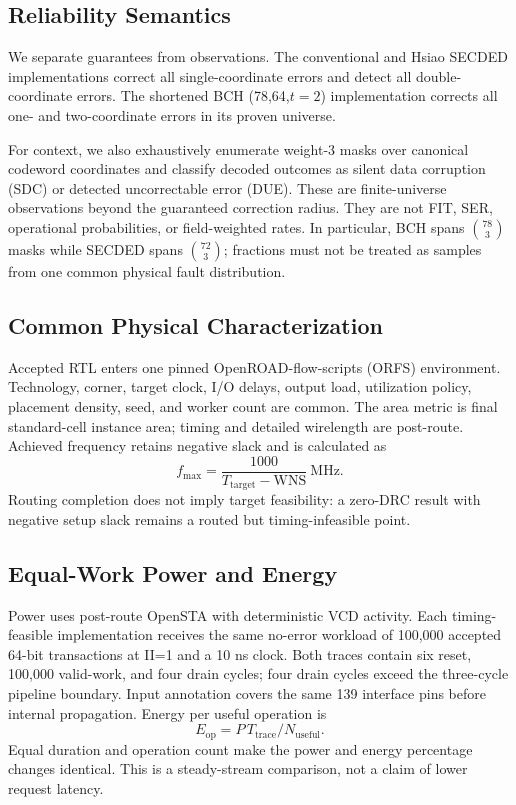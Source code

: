 \subsection{Reliability Semantics}

We separate guarantees from observations. The conventional and Hsiao SECDED implementations correct all single-coordinate errors and detect all double-coordinate errors. The shortened BCH (78,64,$t=2$) implementation corrects all one- and two-coordinate errors in its proven universe.

For context, we also exhaustively enumerate weight-3 masks over canonical codeword coordinates and classify decoded outcomes as silent data corruption (SDC) or detected uncorrectable error (DUE). These are finite-universe observations beyond the guaranteed correction radius. They are not FIT, SER, operational probabilities, or field-weighted rates. In particular, BCH spans $\binom{78}{3}$ masks while SECDED spans $\binom{72}{3}$; fractions must not be treated as samples from one common physical fault distribution.

\subsection{Common Physical Characterization}

Accepted RTL enters one pinned OpenROAD-flow-scripts (ORFS) environment. Technology, corner, target clock, I/O delays, output load, utilization policy, placement density, seed, and worker count are common. The area metric is final standard-cell instance area; timing and detailed wirelength are post-route. Achieved frequency retains negative slack and is calculated as
\begin{equation}
 f_{\max}=\frac{1000}{T_{\mathrm{target}}-\mathrm{WNS}}\ \mathrm{MHz}.
 \label{eq:fmax}
\end{equation}
Routing completion does not imply target feasibility: a zero-DRC result with negative setup slack remains a routed but timing-infeasible point.

\subsection{Equal-Work Power and Energy}

Power uses post-route OpenSTA with deterministic VCD activity. Each timing-feasible implementation receives the same no-error workload of 100,000 accepted 64-bit transactions at II=1 and a 10 ns clock. Both traces contain six reset, 100,000 valid-work, and four drain cycles; four drain cycles exceed the three-cycle pipeline boundary. Input annotation covers the same 139 interface pins before internal propagation. Energy per useful operation is
\begin{equation}
 E_{\mathrm{op}}=P\,T_{\mathrm{trace}}/N_{\mathrm{useful}}.
 \label{eq:energy}
\end{equation}
Equal duration and operation count make the power and energy percentage changes identical. This is a steady-stream comparison, not a claim of lower request latency.

